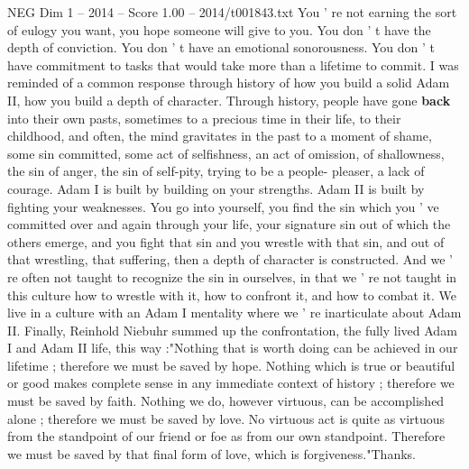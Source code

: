 \begin{textsample}{NEG Dim 1 – 2014 – Score 1.00 – 2014/t001843.txt}
You ' re not earning the sort of eulogy you want, you hope someone will give to you.
You don ' t have the depth of conviction.
You don ' t have an emotional sonorousness.
You don ' t have commitment to tasks that would take more than a lifetime to commit.
I was reminded of a common response through history of how you build a solid Adam II, how you build a depth of character.
Through history, people have gone \textbf{back} into their own pasts, sometimes to a precious time in their life, to their childhood, and often, the mind gravitates in the past to a moment of shame, some sin committed, some act of selfishness, an act of omission, of shallowness, the sin of anger, the sin of self-pity, trying to be a people- pleaser, a lack of courage.
Adam I is built by building on your strengths.
Adam II is built by fighting your weaknesses.
You go into yourself, you find the sin which you ' ve committed over and again through your life, your signature sin out of which the others emerge, and you fight that sin and you wrestle with that sin, and out of that wrestling, that suffering, then a depth of character is constructed.
And we ' re often not taught to recognize the sin in ourselves, in that we ' re not taught in this culture how to wrestle with it, how to confront it, and how to combat it.
We live in a culture with an Adam I mentality where we ' re inarticulate about Adam II.
Finally, Reinhold Niebuhr summed up the confrontation, the fully lived Adam I and Adam II life, this way :"Nothing that is worth doing can be achieved in our lifetime ; therefore we must be saved by hope.
Nothing which is true or beautiful or good makes complete sense in any immediate context of history ; therefore we must be saved by faith.
Nothing we do, however virtuous, can be accomplished alone ; therefore we must be saved by love.
No virtuous act is quite as virtuous from the standpoint of our friend or foe as from our own standpoint.
Therefore we must be saved by that final form of love, which is forgiveness."Thanks.

\end{textsample}
